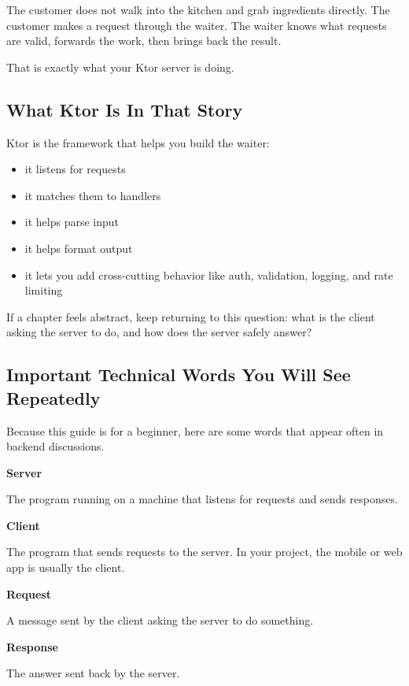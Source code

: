 \documentclass[11pt,a4paper]{article}
\begin{document}
The customer does not walk into the kitchen and grab ingredients directly.
The customer makes a request through the waiter.
The waiter knows what requests are valid, forwards the work, then brings back the result.

That is exactly what your Ktor server is doing.

\subsection{What Ktor Is In That Story}

Ktor is the framework that helps you build the waiter:
\begin{itemize}
    \item it listens for requests
    \item it matches them to handlers
    \item it helps parse input
    \item it helps format output
    \item it lets you add cross-cutting behavior like auth, validation, logging, and rate limiting
\end{itemize}

\begin{kazecalloutbox}
If a chapter feels abstract, keep returning to this question: what is the client asking the server to do, and how does the server safely answer?
\end{kazecalloutbox}

\subsection{Important Technical Words You Will See Repeatedly}

Because this guide is for a beginner, here are some words that appear often in backend discussions.

\textbf{Server}

The program running on a machine that listens for requests and sends responses.

\textbf{Client}

The program that sends requests to the server. In your project, the mobile or web app is usually the client.

\textbf{Request}

A message sent by the client asking the server to do something.

\textbf{Response}

The answer sent back by the server.
\end{document}
